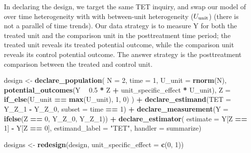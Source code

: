 \documentclass[
]{article}
\newenvironment{Shaded}{\begin{snugshade}}{\end{snugshade}}
\newcommand{\DataTypeTok}[1]{\textcolor[rgb]{0.13,0.29,0.53}{#1}}
\newcommand{\DecValTok}[1]{\textcolor[rgb]{0.00,0.00,0.81}{#1}}
\newcommand{\FloatTok}[1]{\textcolor[rgb]{0.00,0.00,0.81}{#1}}
\newcommand{\KeywordTok}[1]{\textcolor[rgb]{0.13,0.29,0.53}{\textbf{#1}}}
\newcommand{\NormalTok}[1]{#1}
\newcommand{\OperatorTok}[1]{\textcolor[rgb]{0.81,0.36,0.00}{\textbf{#1}}}
\newcommand{\StringTok}[1]{\textcolor[rgb]{0.31,0.60,0.02}{#1}}
\begin{document}
In declaring the design, we target the same TET inquiry, and swap our
model of over time heterogeneity with with between-unit heterogeneity
(\(U_{\rm unit}\)) (there is not a parallel of time trends). Our data
strategy is to measure Y for both the treated unit and the comparison
unit in the posttreatment time period; the treated unit reveals its
treated potential outcome, while the comparison unit reveals its control
potential outcome. The answer strategy is the posttreatment comparison
between the treated and control unit.

\begin{Shaded}
\begin{Highlighting}[]
\NormalTok{design <-}\StringTok{ }
\StringTok{  }\KeywordTok{declare_population}\NormalTok{(}
    \DataTypeTok{N =} \DecValTok{2}\NormalTok{, }
    \DataTypeTok{time =} \DecValTok{1}\NormalTok{,}
    \DataTypeTok{U_unit =} \KeywordTok{rnorm}\NormalTok{(N),}
    \KeywordTok{potential_outcomes}\NormalTok{(Y }\OperatorTok{~}\StringTok{ }\FloatTok{0.5} \OperatorTok{*}\StringTok{ }\NormalTok{Z }\OperatorTok{+}\StringTok{ }\NormalTok{unit_specific_effect }\OperatorTok{*}\StringTok{ }\NormalTok{U_unit),}
    \DataTypeTok{Z =} \KeywordTok{if_else}\NormalTok{(U_unit }\OperatorTok{==}\StringTok{ }\KeywordTok{max}\NormalTok{(U_unit), }\DecValTok{1}\NormalTok{, }\DecValTok{0}\NormalTok{)}
\NormalTok{  ) }\OperatorTok{+}\StringTok{ }
\StringTok{  }\KeywordTok{declare_estimand}\NormalTok{(}\DataTypeTok{TET =}\NormalTok{ Y_Z_}\DecValTok{1} \OperatorTok{-}\StringTok{ }\NormalTok{Y_Z_}\DecValTok{0}\NormalTok{, }\DataTypeTok{subset =}\NormalTok{ time }\OperatorTok{==}\StringTok{ }\DecValTok{1}\NormalTok{) }\OperatorTok{+}\StringTok{ }
\StringTok{  }\KeywordTok{declare_measurement}\NormalTok{(}\DataTypeTok{Y =} \KeywordTok{ifelse}\NormalTok{(Z }\OperatorTok{==}\StringTok{ }\DecValTok{0}\NormalTok{, Y_Z_}\DecValTok{0}\NormalTok{, Y_Z_}\DecValTok{1}\NormalTok{)) }\OperatorTok{+}\StringTok{ }
\StringTok{  }\KeywordTok{declare_estimator}\NormalTok{(}
    \DataTypeTok{estimate =}\NormalTok{ Y[Z }\OperatorTok{==}\StringTok{ }\DecValTok{1}\NormalTok{] }\OperatorTok{-}\StringTok{ }\NormalTok{Y[Z }\OperatorTok{==}\StringTok{ }\DecValTok{0}\NormalTok{], }
    \DataTypeTok{estimand_label =} \StringTok{"TET"}\NormalTok{, }\DataTypeTok{handler =}\NormalTok{ summarize)}

\NormalTok{designs <-}\StringTok{ }\KeywordTok{redesign}\NormalTok{(design, }\DataTypeTok{unit_specific_effect =} \KeywordTok{c}\NormalTok{(}\DecValTok{0}\NormalTok{, }\DecValTok{1}\NormalTok{))}
\end{Highlighting}
\end{Shaded}
\end{document}
